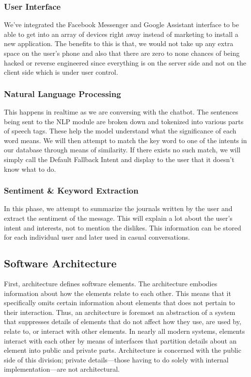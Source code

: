 \documentclass[conference,compsoc]{IEEEtran}
\begin{document}
\subsubsection{User Interface}

We’ve integrated the Facebook Messenger and Google Assistant interface to be able to get into an array of devices right away instead of marketing to install a new application. The benefits to this is that, we would not take up any extra space on the user’s phone and also that there are zero to none chances of being hacked or reverse engineered since everything is on the server side and not on the client side which is under user control.

\subsubsection{Natural Language Processing}

This happens in realtime as we are conversing with the chatbot. The sentences being sent to the NLP module are broken down and tokenized into various parts of speech tags. These help the model understand what the significance of each word means. We will then attempt to match the key word to one of the intents in our database through means of similarity. If there exists no such match, we will simply call the Default Fallback Intent and display to the user that it doesn’t know what to do.

\subsubsection{Sentiment \& Keyword Extraction}

In this phase, we attempt to summarize the journals written by the user and extract the sentiment of the message. This will explain a lot about the user’s intent and interests, not to mention the dislikes. This information can be stored for each individual user and later used in casual conversations.

\subsection{Software Architecture}

First, architecture defines software elements. The architecture embodies information about how the elements relate to each other. This
means that it specifically omits certain information about elements that does not pertain to their interaction. Thus, an architecture is
foremost an abstraction of a system that suppresses details of elements that do not affect how they use, are used by, relate to, or interact
with other elements. In nearly all modern systems, elements interact with each other by means of interfaces that partition details about an
element into public and private parts. Architecture is concerned with the public side of this division; private details—those having to do
solely with internal implementation—are not architectural.
\end{document}
